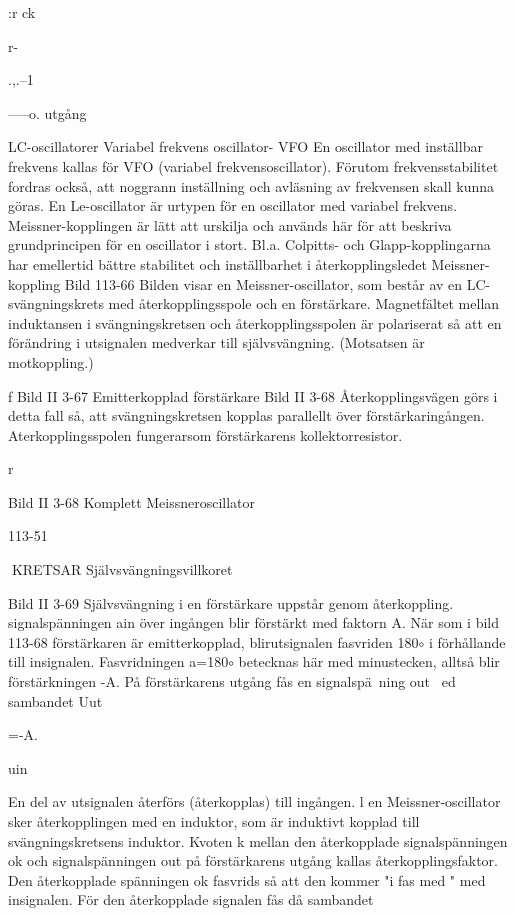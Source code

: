 {{{{:r
ck

r-

.,.--1}-----o.
utgång

LC-oscillatorer
Variabel frekvens oscillator- VFO
En oscillator med inställbar frekvens kallas
för VFO (variabel frekvensoscillator). Förutom frekvensstabilitet fordras också, att
noggrann inställning och avläsning av frekvensen skall kunna göras.
En Le-oscillator är urtypen för en oscillator med variabel frekvens. Meissner-kopplingen är lätt att urskilja och används här för
att beskriva grundprincipen för en oscillator
i stort. Bl.a. Colpitts- och Glapp-kopplingarna har emellertid bättre stabilitet och
inställbarhet i återkopplingsledet
Meissner-koppling
Bild 113-66
Bilden visar en Meissner-oscillator, som består av en LC-svängningskrets med återkopplingsspole och en förstärkare. Magnetfältet mellan induktansen i svängningskretsen och återkopplingsspolen är polariserat
så att en förändring i utsignalen medverkar
till självsvängning. (Motsatsen är motkoppling.)

f
Bild II 3-67 Emitterkopplad förstärkare
Bild II 3-68
Återkopplingsvägen görs i detta fall så, att
svängningskretsen kopplas parallellt över
förstärkaringången. Aterkopplingsspolen
fungerarsom förstärkarens kollektorresistor.

r

Bild II 3-68 Komplett Meissneroscillator

113-51

KRETSAR
Självsvängningsvillkoret

Bild II 3-69
Självsvängning i en förstärkare uppstår genom återkoppling. signalspänningen ain över
ingången blir förstärkt med faktorn A. När
som i bild 113-68 förstärkaren är emitterkopplad, blirutsignalen fasvriden 180\(\circ\) i förhållande till insignalen. Fasvridningen a=180\(\circ\) betecknas här med minustecken, alltså blir
förstärkningen -A.
På förstärkarens utgång fås en signalspä~ning out ~ed sambandet
Uut

=-A.

uin

En del av utsignalen återförs (återkopplas) till ingången. l en Meissner-oscillator
sker återkopplingen med en induktor, som är
induktivt kopplad till svängningskretsens induktor.
Kvoten k mellan den återkopplade signalspänningen ok och signalspänningen out
på förstärkarens utgång kallas återkopplingsfaktor. Den återkopplade spänningen
ok fasvrids så att den kommer "i fas med "
med insignalen. För den återkopplade signalen fås då sambandet

}}}
